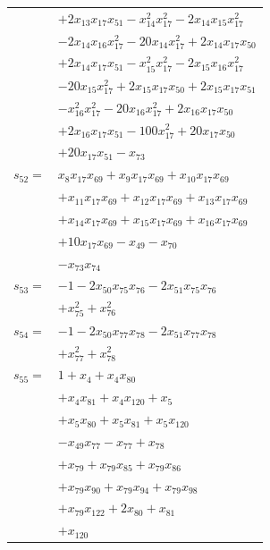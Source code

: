 \begin{longtable}{@{}r@{\;}l@{}}
 & \(\displaystyle +2x_{13}x_{17}x_{51} -x_{14}^{2}x_{17}^{2} -2x_{14}x_{15}x_{17}^{2}\) \\
 & \(\displaystyle -2x_{14}x_{16}x_{17}^{2} -20x_{14}x_{17}^{2} +2x_{14}x_{17}x_{50}\) \\
 & \(\displaystyle +2x_{14}x_{17}x_{51} -x_{15}^{2}x_{17}^{2} -2x_{15}x_{16}x_{17}^{2}\) \\
 & \(\displaystyle -20x_{15}x_{17}^{2} +2x_{15}x_{17}x_{50} +2x_{15}x_{17}x_{51}\) \\
 & \(\displaystyle -x_{16}^{2}x_{17}^{2} -20x_{16}x_{17}^{2} +2x_{16}x_{17}x_{50}\) \\
 & \(\displaystyle +2x_{16}x_{17}x_{51} -100x_{17}^{2} +20x_{17}x_{50}\) \\
 & \(\displaystyle +20x_{17}x_{51} -x_{73}\) \\[3pt]
\(s_{52}=\) & \(\displaystyle x_{8}x_{17}x_{69} +x_{9}x_{17}x_{69} +x_{10}x_{17}x_{69}\) \\
 & \(\displaystyle +x_{11}x_{17}x_{69} +x_{12}x_{17}x_{69} +x_{13}x_{17}x_{69}\) \\
 & \(\displaystyle +x_{14}x_{17}x_{69} +x_{15}x_{17}x_{69} +x_{16}x_{17}x_{69}\) \\
 & \(\displaystyle +10x_{17}x_{69} -x_{49} -x_{70}\) \\
 & \(\displaystyle -x_{73}x_{74}\) \\[3pt]
\(s_{53}=\) & \(\displaystyle -1 -2x_{50}x_{75}x_{76} -2x_{51}x_{75}x_{76}\) \\
 & \(\displaystyle +x_{75}^{2} +x_{76}^{2}\) \\[3pt]
\(s_{54}=\) & \(\displaystyle -1 -2x_{50}x_{77}x_{78} -2x_{51}x_{77}x_{78}\) \\
 & \(\displaystyle +x_{77}^{2} +x_{78}^{2}\) \\[3pt]
\(s_{55}=\) & \(\displaystyle 1 +x_{4} +x_{4}x_{80}\) \\
 & \(\displaystyle +x_{4}x_{81} +x_{4}x_{120} +x_{5}\) \\
 & \(\displaystyle +x_{5}x_{80} +x_{5}x_{81} +x_{5}x_{120}\) \\
 & \(\displaystyle -x_{49}x_{77} -x_{77} +x_{78}\) \\
 & \(\displaystyle +x_{79} +x_{79}x_{85} +x_{79}x_{86}\) \\
 & \(\displaystyle +x_{79}x_{90} +x_{79}x_{94} +x_{79}x_{98}\) \\
 & \(\displaystyle +x_{79}x_{122} +2x_{80} +x_{81}\) \\
 & \(\displaystyle +x_{120}\) \\[3pt]

\end{longtable}
